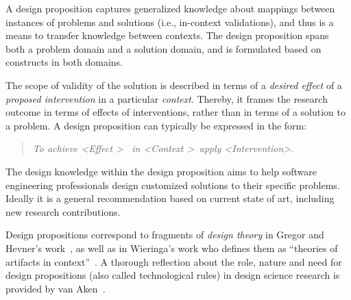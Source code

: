 \documentclass[graybox]{svmult}
\newcommand{\peggy}[1]{\textcolor{blue}{{\it [Peggy says: #1]}}}
\newcommand{\per}[1]{\textcolor{cyan}{{\it [Per says: #1]}}}
\newcommand{\peggy}[1]{}
\newcommand{\per}[1]{}
\begin{document}

A design proposition captures generalized knowledge about mappings between instances of problems and solutions (i.e., in-context validations), and thus is a means to transfer knowledge between contexts. The design proposition spans both a problem domain and a solution domain, and is formulated based on constructs in both domains. 

The scope of validity of the solution is described in terms of a  \emph{desired effect} of a \emph{proposed intervention} in a particular \emph{context}. Thereby, it frames the research outcome in terms of effects of interventions, rather than in terms of a solution to a problem. A design proposition can typically be expressed in the form: 

\begin{quote}{\emph{To achieve \textless Effect \textgreater ~ in \textless Context \textgreater~apply \textless Intervention\textgreater}.} 
\end{quote}
The design knowledge within the design proposition aims to help software engineering professionals design customized solutions to their specific problems. Ideally it is a general recommendation based on current state of art, including new research contributions.

Design propositions correspond to fragments of \emph{design theory} in Gregor and Hevner's work~\cite{gregor_positioning_2013}, as well as in Wieringa's work who defines them as ``theories of artifacts in context''~\cite{wieringa_design_2009}. A thorough reflection about the role, nature and need for design propositions (also called technological rules) in design science research is provided by van Aken~\cite{van_aken_management_2004}.
\end{document}
